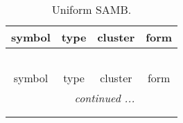 \documentclass[fleqn,10pt,landscape]{article}
\begin{document}
\begin{itemize}
\begin{center}
\begin{longtable}{c|c|c|c}
\end{longtable}
\end{center}
\begin{center}
\renewcommand{\arraystretch}{1.3}
\begin{longtable}{c|c|c|c}
\caption{Uniform SAMB.}
 \\
 \hline \hline
symbol & type & cluster & form \\ \hline \endfirsthead

\multicolumn{3}{l}{\tablename\ \thetable{}} \\
 \hline \hline
symbol & type & cluster & form \\ \hline \endhead

 \hline \hline
\multicolumn{3}{r}{\footnotesize\it continued ...} \\ \endfoot

 \hline \hline
\multicolumn{3}{r}{} \\ \endlastfoot


\end{longtable}
\end{center}
\end{itemize}
\end{document}
